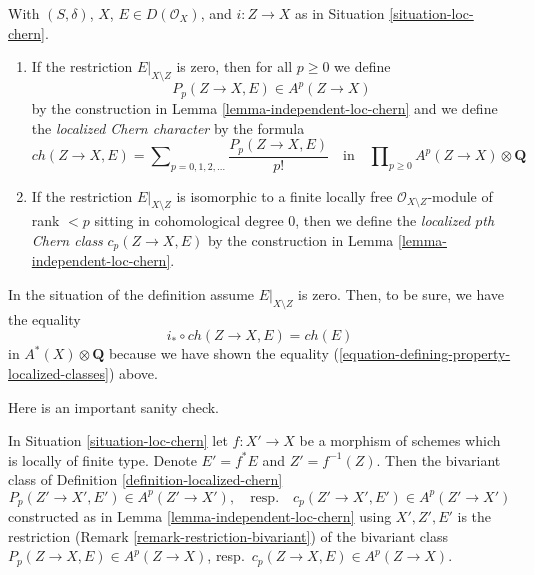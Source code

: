 \begin{definition}
\label{definition-localized-chern}
With $(S, \delta)$, $X$, $E \in D(\mathcal{O}_X)$, and $i : Z \to X$ as in
Situation \ref{situation-loc-chern}.
\begin{enumerate}
\item If the restriction $E|_{X \setminus Z}$ is zero, then for all
$p \geq 0$ we define
$$
P_p(Z \to X, E) \in A^p(Z \to X)
$$
by the construction in Lemma \ref{lemma-independent-loc-chern}
and we define the {\it localized Chern character} by the formula
$$
ch(Z \to X, E) =
\sum\nolimits_{p = 0, 1, 2, \ldots} \frac{P_p(Z \to X, E)}{p!}
\quad\text{in}\quad \prod\nolimits_{p \geq 0} A^p(Z \to X) \otimes \mathbf{Q}
$$
\item If the restriction $E|_{X \setminus Z}$ is isomorphic to a
finite locally free $\mathcal{O}_{X \setminus Z}$-module of rank $< p$
sitting in cohomological degree $0$, then we define the
{\it localized $p$th Chern class} $c_p(Z \to X, E)$ by the construction
in Lemma \ref{lemma-independent-loc-chern}.
\end{enumerate}
\end{definition}

\noindent
In the situation of the definition assume $E|_{X \setminus Z}$ is zero.
Then, to be sure, we have the equality
$$
i_* \circ ch(Z \to X, E) = ch(E)
$$
in $A^*(X) \otimes \mathbf{Q}$ because we have shown the
equality (\ref{equation-defining-property-localized-classes}) above.

\medskip\noindent
Here is an important sanity check.

\begin{lemma}
\label{lemma-base-change-loc-chern}
In Situation \ref{situation-loc-chern}
let $f : X' \to X$ be a morphism of schemes which is locally of finite type.
Denote $E' = f^*E$ and $Z' = f^{-1}(Z)$. Then the bivariant class
of Definition \ref{definition-localized-chern}
$$
P_p(Z' \to X', E') \in A^p(Z' \to X'),
\quad\text{resp.}\quad
c_p(Z' \to X', E') \in A^p(Z' \to X')
$$
constructed as in Lemma \ref{lemma-independent-loc-chern}
using $X', Z', E'$ is the restriction
(Remark \ref{remark-restriction-bivariant}) of the
bivariant class $P_p(Z \to X, E) \in A^p(Z \to X)$,
resp.\ $c_p(Z \to X, E) \in A^p(Z \to X)$.
\end{lemma}


